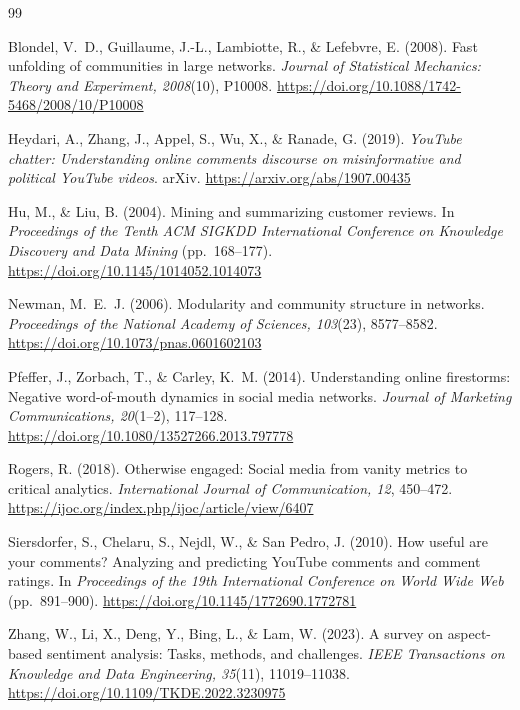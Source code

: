 \renewcommand{\refname}{參考文獻}
\begin{thebibliography}{99}
\setlength{\itemsep}{4pt}

Blondel, V.~D., Guillaume, J.-L., Lambiotte, R., \& Lefebvre, E. (2008).
Fast unfolding of communities in large networks.
\textit{Journal of Statistical Mechanics: Theory and Experiment, 2008}(10), P10008.
\url{https://doi.org/10.1088/1742-5468/2008/10/P10008}

Heydari, A., Zhang, J., Appel, S., Wu, X., \& Ranade, G. (2019).
\textit{YouTube chatter: Understanding online comments discourse on misinformative and political YouTube videos}.
arXiv. \url{https://arxiv.org/abs/1907.00435}

Hu, M., \& Liu, B. (2004). Mining and summarizing customer reviews.
In \textit{Proceedings of the Tenth ACM SIGKDD International Conference on Knowledge Discovery and Data Mining} (pp.~168--177).
\url{https://doi.org/10.1145/1014052.1014073}

Newman, M.~E.~J. (2006). Modularity and community structure in networks.
\textit{Proceedings of the National Academy of Sciences, 103}(23), 8577--8582.
\url{https://doi.org/10.1073/pnas.0601602103}

Pfeffer, J., Zorbach, T., \& Carley, K.~M. (2014).
Understanding online firestorms: Negative word-of-mouth dynamics in social media networks.
\textit{Journal of Marketing Communications, 20}(1--2), 117--128.
\url{https://doi.org/10.1080/13527266.2013.797778}

Rogers, R. (2018). Otherwise engaged: Social media from vanity metrics to critical analytics.
\textit{International Journal of Communication, 12}, 450--472.
\url{https://ijoc.org/index.php/ijoc/article/view/6407}

Siersdorfer, S., Chelaru, S., Nejdl, W., \& San Pedro, J. (2010).
How useful are your comments? Analyzing and predicting YouTube comments and comment ratings.
In \textit{Proceedings of the 19th International Conference on World Wide Web} (pp.~891--900).
\url{https://doi.org/10.1145/1772690.1772781}

Zhang, W., Li, X., Deng, Y., Bing, L., \& Lam, W. (2023).
A survey on aspect-based sentiment analysis: Tasks, methods, and challenges.
\textit{IEEE Transactions on Knowledge and Data Engineering, 35}(11), 11019--11038.
\url{https://doi.org/10.1109/TKDE.2022.3230975}

\end{thebibliography}
